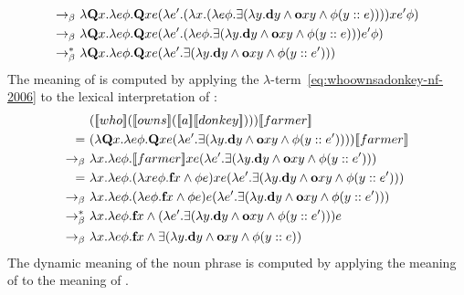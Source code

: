 \begin{example}
\begin{align}
\bconv \ &  \lambda  \Q2 \x1. \lambda e \phi. \Q2 \x1 e (\lambda e'.   ( \lambda \x1. ( \lambda e \phi. \exists (\lambda \y1.  \cdonkey \y1  \land  \cown \x1 \y1 \land \phi (\upii{\y1}{e}) )  )  ) \x1    e' \phi) \notag \\
\bconv \ &  \lambda  \Q2 \x1. \lambda e \phi. \Q2 \x1 e (\lambda e'.  ( \lambda e \phi. \exists (\lambda \y1.  \cdonkey \y1  \land  \cown \x1 \y1 \land \phi (\upii{\y1}{e}) )  )     e' \phi) \notag \\
\bred \ &  \lambda  \Q2 \x1. \lambda e \phi. \Q2 \x1 e (\lambda e'.  \exists (\lambda \y1.  \cdonkey \y1  \land  \cown \x1 \y1 \land \phi (\upii{\y1}{e'}) )  )    \label{eq:whoownsadonkey-nf-2006}
\end{align}
The meaning of  is computed by applying the $\lambda$-term~\eqref{eq:whoownsadonkey-nf-2006} to the lexical interpretation of :
\begin{align*}
& (\trr{\I{who}}  (\trr{\I{owns}}  (\trr{\I{a}}  \trr{\I{donkey}} ) ) )\trr{\I{farmer}} \\
 = \ &  (  \lambda  \Q2 \x1. \lambda e \phi. \Q2 \x1 e (\lambda e'.  \exists (\lambda \y1.  \cdonkey \y1  \land  \cown \x1 \y1 \land \phi (\upii{\y1}{e'}) )  ) ) \trr{\I{farmer}}  \\
 \bconv \ &   \lambda   \x1. \lambda e \phi.  \trr{\I{farmer}}  \x1 e (\lambda e'.  \exists (\lambda \y1.  \cdonkey \y1  \land  \cown \x1 \y1 \land \phi (\upii{\y1}{e'}) )  ) \\
 = \ &    \lambda   \x1. \lambda e \phi.  (\lambda \x1 e \phi.  \cfarmer \x1 \land \phi e) \x1 e (\lambda e'.  \exists (\lambda \y1.  \cdonkey \y1  \land  \cown \x1 \y1 \land \phi (\upii{\y1}{e'}) )  ) \\
\bconv \ & \lambda   \x1. \lambda e \phi.  (\lambda  e \phi.  \cfarmer \x1 \land \phi e)  e (\lambda e'.  \exists (\lambda \y1.  \cdonkey \y1  \land  \cown \x1 \y1 \land \phi (\upii{\y1}{e'}) )  ) \\
\bred \ & \lambda   \x1. \lambda e \phi. \cfarmer \x1 \land  (\lambda e'.  \exists (\lambda \y1.  \cdonkey \y1  \land  \cown \x1 \y1 \land \phi (\upii{\y1}{e'}) )  ) e   \\
\bconv \ &  \lambda   \x1. \lambda e \phi. \cfarmer \x1 \land   \exists (\lambda \y1.  \cdonkey \y1  \land  \cown \x1 \y1 \land \phi (\upii{\y1}{e}) )         
\end{align*}
The dynamic meaning of the noun phrase  is computed by applying the meaning of  to the meaning of .  

\end{example}
